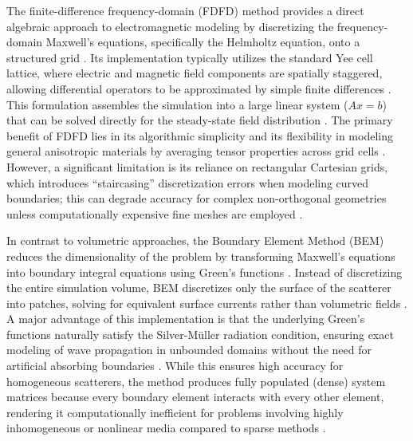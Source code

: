\documentclass[class=report, crop=false]{standalone}
\begin{document}
The finite-difference frequency-domain (FDFD) method provides a direct algebraic approach to electromagnetic modeling by discretizing the frequency-domain Maxwell's equations, specifically the Helmholtz equation, onto a structured grid \citep{Rumpf2014}. Its implementation typically utilizes the standard Yee cell lattice, where electric and magnetic field components are spatially staggered, allowing differential operators to be approximated by simple finite differences \citep{Rumpf2014}. This formulation assembles the simulation into a large linear system ($Ax=b$) that can be solved directly for the steady-state field distribution \citep{Shin2012}. The primary benefit of FDFD lies in its algorithmic simplicity and its flexibility in modeling general anisotropic materials by averaging tensor properties across grid cells \citep{Rumpf2014}. However, a significant limitation is its reliance on rectangular Cartesian grids, which introduces ``staircasing'' discretization errors when modeling curved boundaries; this can degrade accuracy for complex non-orthogonal geometries unless computationally expensive fine meshes are employed \citep{Shin2012}.

\vspace{12pt}

In contrast to volumetric approaches, the Boundary Element Method (BEM) reduces the dimensionality of the problem by transforming Maxwell's equations into boundary integral equations using Green's functions \citep{Buffa2003}. Instead of discretizing the entire simulation volume, BEM discretizes only the surface of the scatterer into patches, solving for equivalent surface currents rather than volumetric fields \citep{Buffa2003}. A major advantage of this implementation is that the underlying Green's functions naturally satisfy the Silver-Müller radiation condition, ensuring exact modeling of wave propagation in unbounded domains without the need for artificial absorbing boundaries \citep{Buffa2003}. While this ensures high accuracy for homogeneous scatterers, the method produces fully populated (dense) system matrices because every boundary element interacts with every other element, rendering it computationally inefficient for problems involving highly inhomogeneous or nonlinear media compared to sparse methods \citep{Buffa2003}.

\vspace{12pt}
\end{document}
